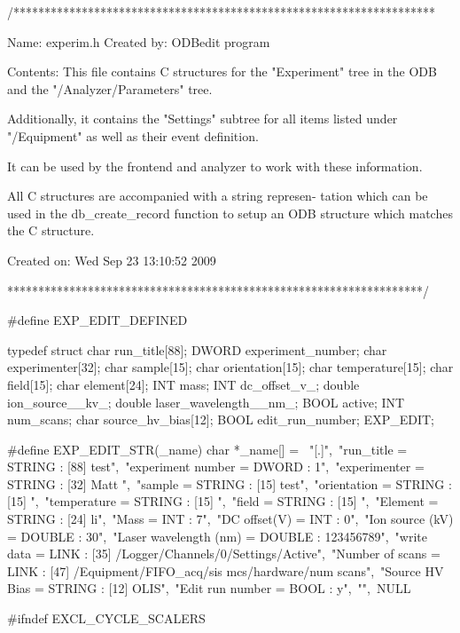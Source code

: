 \begin{DoxyCode}
/********************************************************************\

  Name:         experim.h
  Created by:   ODBedit program

  Contents:     This file contains C structures for the "Experiment"
                tree in the ODB and the "/Analyzer/Parameters" tree.


                Additionally, it contains the "Settings" subtree for
                all items listed under "/Equipment" as well as their
                event definition.

                It can be used by the frontend and analyzer to work
                with these information.

                All C structures are accompanied with a string represen-
                tation which can be used in the db_create_record function
                to setup an ODB structure which matches the C structure.

  Created on:   Wed Sep 23 13:10:52 2009

\********************************************************************/

#define EXP_EDIT_DEFINED

typedef struct {
  char      run_title[88];
  DWORD     experiment_number;
  char      experimenter[32];
  char      sample[15];
  char      orientation[15];
  char      temperature[15];
  char      field[15];
  char      element[24];
  INT       mass;
  INT       dc_offset_v_;
  double    ion_source__kv_;
  double    laser_wavelength__nm_;
  BOOL      active;
  INT       num_scans;
  char      source_hv_bias[12];
  BOOL      edit_run_number;
} EXP_EDIT;

#define EXP_EDIT_STR(_name) char *_name[] = {\
"[.]",\
"run_title = STRING : [88] test",\
"experiment number = DWORD : 1",\
"experimenter = STRING : [32] Matt ",\
"sample = STRING : [15] test",\
"orientation = STRING : [15] ",\
"temperature = STRING : [15] ",\
"field = STRING : [15] ",\
"Element = STRING : [24] li",\
"Mass = INT : 7",\
"DC offset(V) = INT : 0",\
"Ion source (kV) = DOUBLE : 30",\
"Laser wavelength (nm) = DOUBLE : 123456789",\
"write data = LINK : [35] /Logger/Channels/0/Settings/Active",\
"Number of scans = LINK : [47] /Equipment/FIFO_acq/sis mcs/hardware/num scans",\
"Source HV Bias = STRING : [12] OLIS",\
"Edit run number = BOOL : y",\
"",\
NULL }




#ifndef EXCL_CYCLE_SCALERS


\end{DoxyCode}
